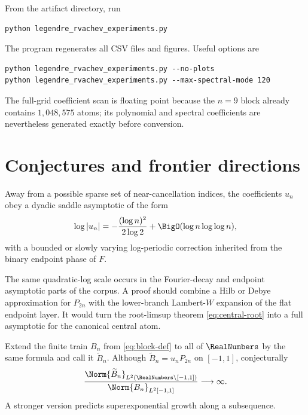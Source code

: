 \documentclass[11pt,oneside]{article}
\numberwithin{equation}{section}
\theoremstyle{definition}
\theoremstyle{remark}
\begin{document}
From the artifact directory, run
\begin{lstlisting}[style=pythonstyle]
python legendre_rvachev_experiments.py
\end{lstlisting}
The program regenerates all CSV files and figures.  Useful options are
\begin{lstlisting}[style=pythonstyle]
python legendre_rvachev_experiments.py --no-plots
python legendre_rvachev_experiments.py --max-spectral-mode 120
\end{lstlisting}
The full-grid coefficient scan is floating point because the $n=9$ block
already contains $1{,}048{,}575$ atoms; its polynomial and spectral
coefficients are nevertheless generated exactly before conversion.

\section{Conjectures and frontier directions}
\label{sec:frontiers}

\begin{conjecture}
\label{conj:legendre-saddle}
Away from a possible sparse set of near-cancellation indices, the coefficients
$u_n$ obey a dyadic saddle asymptotic of the form
\begin{equation}
 \log|u_n|=-\frac{(\log n)^2}{2\log2}
 +\BigO(\log n\log\log n),
 \label{eq:legendre-saddle-conj}
\end{equation}
with a bounded or slowly varying log-periodic correction inherited from the
binary endpoint phase of $F$.
\end{conjecture}

The same quadratic-log scale occurs in the Fourier-decay and endpoint
asymptotic parts of the corpus.  A proof should combine a Hilb or Debye
approximation for $P_{2n}$ with the lower-branch Lambert-$W$ expansion of the
flat endpoint layer.  It would turn the root-limsup theorem
\eqref{eq:central-root} into a full asymptotic for the canonical central atom.

\begin{conjecture}
\label{conj:side-lobes}
Extend the finite train $B_n$ from \eqref{eq:block-def} to all of $\RealNumbers$ by the
same formula and call it $\widetilde B_n$.  Although
$\widetilde B_n=u_nP_{2n}$ on $[-1,1]$, conjecturally
\begin{equation}
 \frac{\Norm{\widetilde B_n}_{L^2(\RealNumbers\setminus[-1,1])}}
 {\Norm{B_n}_{L^2[-1,1]}}\longrightarrow\infty.
 \label{eq:side-lobe-conj}
\end{equation}
A stronger version predicts superexponential growth along a subsequence.
\end{conjecture}
\end{document}
